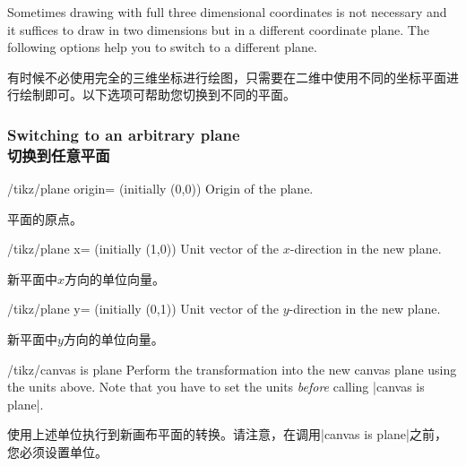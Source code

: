 Sometimes drawing with full three dimensional coordinates is not necessary and
it suffices to draw in two dimensions but in a different coordinate plane.  The
following options help you to switch to a different plane.

有时候不必使用完全的三维坐标进行绘图，只需要在二维中使用不同的坐标平面进行绘制即可。以下选项可帮助您切换到不同的平面。


\subsubsection{Switching to an arbitrary plane\\切换到任意平面}

\begin{key}{/tikz/plane origin= (initially {(0,0)})}
    Origin of the plane.

    平面的原点。

\end{key}

\begin{key}{/tikz/plane x= (initially {(1,0)})}
    Unit vector of the $x$-direction in the new plane.

    新平面中$x$方向的单位向量。

\end{key}

\begin{key}{/tikz/plane y= (initially {(0,1)})}
    Unit vector of the $y$-direction in the new plane.

    新平面中$y$方向的单位向量。

\end{key}

\begin{key}{/tikz/canvas is plane}
    Perform the transformation into the new canvas plane using the units above.
    Note that you have to set the units \emph{before} calling
    |canvas is plane|.
    
    使用上述单位执行到新画布平面的转换。请注意，在调用|canvas is plane|之前，您必须设置单位。

\begin{codeexample}[preamble={\usetikzlibrary{3d}}]
\end{codeexample}
\end{key}


